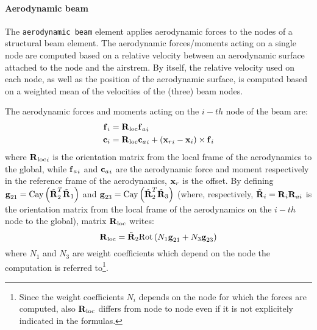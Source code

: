 \paragraph{Aerodynamic beam}

The \texttt{aerodynamic beam} element applies aerodynamic forces
to the nodes of a structural beam element. 
The aerodynamic forces/moments acting on a single node 
are computed based on a relative 
velocity between an aerodynamic surface attached 
to the node and the airstrem. By itself, the relative velocity 
used on each node, as well as the position of the aerodynamic 
surface, is computed based on a weighted mean of the velocities
of the (three) beam nodes. 

\newcommand{\Rloc}{{\TT{R}_{\text{loc}}}}
\newcommand{\Rtilde}[1]{\tilde{\TT{R}}_{#1}}
\newcommand{\Cay}[1]{\text{Cay}\plbr{#1}}
\newcommand{\Rot}[1]{\text{Rot}\plbr{#1}}
The aerodynamic forces and moments acting on the $i-th$ node of the
beam are:
\begin{subequations}\label{eq:fici}
\begin{align}
	\T{f}_i &= \Rloc {\T{f}_a}_i\\ 
	\T{c}_i &= \Rloc {\T{c}_a}_i 
		+ \plbr{{\T{x}_r}_i - \T{x}_i}\times{\T{f}}_i 
\end{align}
\end{subequations}
where $\Rloc_i$ is the orientation 
matrix from the local frame of the aerodynamics
to the global, while ${\bm{\mathbf{f}}_a}_i$ and ${\bm{\mathbf{c}}_a}_i$ are the 
aerodynamic force and moment 
respectively in the reference frame of the aerodynamics, $\bm{\mathbf{x}}_r$
is the offset. 
By defining $\T{g}_{21} = \Cay{\Rtilde{2}^T\Rtilde{1}}$ 
and $\T{g}_{23} = \Cay{\Rtilde{2}^T\Rtilde{3}}$ (where, respectively,
$\Rtilde{i} = \TT{R}_i\TT{R}_{ai}$ is the orientation matrix from the 
local frame of the aerodynamics on the $i-th$ node to the global),
matrix $\Rloc$ writes:
\begin{equation}
	\Rloc = \Rtilde{2} \Rot{N_1\T{g}_{21} + N_3\T{g}_{23}}
\end{equation}
where $N_1$ and $N_3$ are weight coefficients which depend on
the node the computation is referred to\footnote{Since the 
weight coefficients $N_i$ depends on the node for which the
forces are computed, also $\Rloc$ differs from node to node
even if it is not explicitely indicated in the formulas. }.

